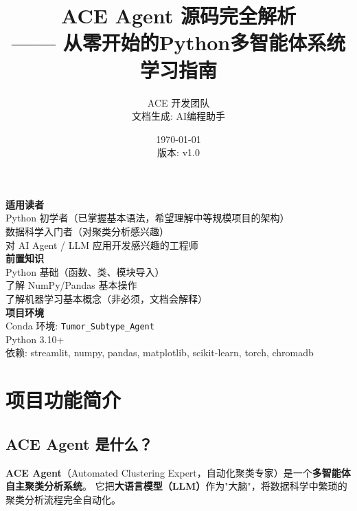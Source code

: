 \documentclass[11pt,a4paper]{ctexbook}
\title{\textbf{ACE Agent 源码完全解析}\\ —— 从零开始的Python多智能体系统学习指南}
\author{ACE 开发团队 \\ 文档生成: AI编程助手}
\date{\today \\ 版本: v1.0}
\begin{document}
\maketitle

\thispagestyle{empty}
\begin{center}
    \vspace{4cm}
    \Large\textbf{适用读者}\\[0.5cm]
    \normalsize
    Python 初学者（已掌握基本语法，希望理解中等规模项目的架构）\\
    数据科学入门者（对聚类分析感兴趣）\\
    对 AI Agent / LLM 应用开发感兴趣的工程师\\[2cm]

    \textbf{前置知识}\\[0.5cm]
    Python 基础（函数、类、模块导入）\\
    了解 NumPy/Pandas 基本操作\\
    了解机器学习基本概念（非必须，文档会解释）\\[2cm]

    \textbf{项目环境}\\[0.5cm]
    Conda 环境: \texttt{Tumor\_Subtype\_Agent}\\
    Python 3.10+\\
    依赖: streamlit, numpy, pandas, matplotlib, scikit-learn, torch, chromadb
\end{center}

\newpage
\tableofcontents
\newpage

\chapter{项目功能简介}

\section{ACE Agent 是什么？}

\textbf{ACE Agent}（Automated Clustering Expert，自动化聚类专家）是一个\textbf{多智能体自主聚类分析系统}。
它把\textbf{大语言模型（LLM）}作为"大脑"，将数据科学中繁琐的聚类分析流程完全自动化。
\end{document}

